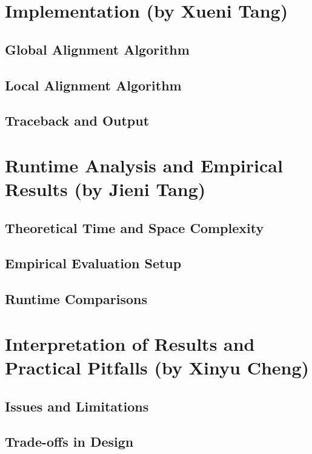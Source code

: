 \documentclass[12pt]{article}
\begin{document}
\section{Implementation (by Xueni Tang)}
\subsection{Global Alignment Algorithm}

\subsection{Local Alignment Algorithm}

\subsection{Traceback and Output}

\section{Runtime Analysis and Empirical Results (by Jieni Tang)}
\subsection{Theoretical Time and Space Complexity}

\subsection{Empirical Evaluation Setup}

\subsection{Runtime Comparisons}

\section{Interpretation of Results and Practical Pitfalls (by Xinyu Cheng)}
\subsection{Issues and Limitations}

\subsection{Trade-offs in Design}
\end{document}
